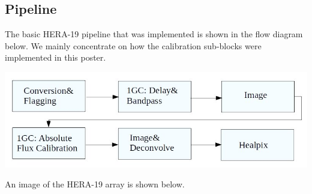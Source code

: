 \documentclass[a0,portrait]{a0poster}
\begin{document}
\begin{multicols}{2}


\color{DarkSlateGray} %
\section*{Pipeline}

The basic HERA-19 pipeline that was implemented is shown in the flow diagram below. We mainly concentrate on how the calibration sub-blocks were implemented in this poster.  

\begin{center}\vspace{1cm}
\includegraphics[width=0.8\linewidth]{pipeline.jpg}
\end{center}\vspace{1cm}

An image of the HERA-19 array is shown below. 


\end{multicols}
\end{document}
